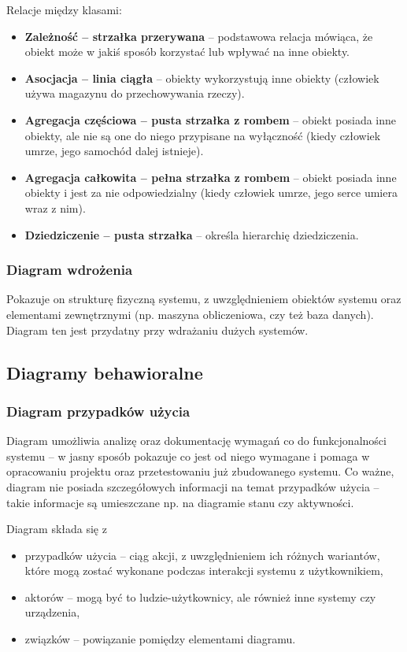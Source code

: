 Relacje między klasami:
\begin{itemize}
	\item{\textbf{Zależność -- strzałka przerywana} -- podstawowa relacja mówiąca, że obiekt może w jakiś sposób korzystać lub wpływać na inne obiekty.}
	\item{\textbf{Asocjacja -- linia ciągła} -- obiekty wykorzystują inne obiekty (człowiek używa magazynu do przechowywania rzeczy).}
	\item{\textbf{Agregacja częściowa -- pusta strzałka z rombem} -- obiekt posiada inne obiekty, ale nie są one do niego przypisane na wyłączność (kiedy człowiek umrze, jego samochód dalej istnieje).}
	\item{\textbf{Agregacja całkowita -- pełna strzałka z rombem} -- obiekt posiada inne obiekty i jest za nie odpowiedzialny (kiedy człowiek umrze, jego serce umiera wraz z nim).}
	\item{\textbf{Dziedziczenie -- pusta strzałka} -- określa hierarchię dziedziczenia.}
\end{itemize}

\subsubsection{Diagram wdrożenia}
Pokazuje on strukturę fizyczną systemu, z uwzględnieniem obiektów systemu oraz elementami zewnętrznymi (np. maszyna obliczeniowa, czy też baza danych). Diagram ten jest przydatny przy wdrażaniu dużych systemów.

\subsection{Diagramy behawioralne}
\subsubsection{Diagram przypadków użycia}
Diagram umożliwia analizę oraz dokumentację wymagań co do funkcjonalności systemu -- w jasny sposób pokazuje co jest od niego wymagane i pomaga w opracowaniu projektu oraz przetestowaniu już zbudowanego systemu. Co ważne, diagram nie posiada szczegółowych informacji na temat przypadków użycia -- takie informacje są umieszczane np. na diagramie stanu czy aktywności.

Diagram składa się z
\begin{itemize}
	\item{przypadków użycia -- ciąg akcji, z uwzględnieniem ich różnych wariantów, które mogą zostać wykonane podczas interakcji systemu z użytkownikiem,}
	\item{aktorów -- mogą być to ludzie-użytkownicy, ale również inne systemy czy urządzenia,}
	\item{związków -- powiązanie pomiędzy elementami diagramu.}
\end{itemize}

